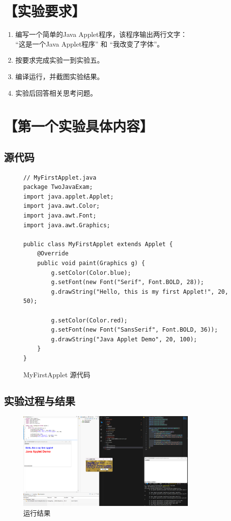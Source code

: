 \documentclass[12pt,a4paper]{article}
\begin{document}
\section*{【实验要求】}
\begin{enumerate}
    \item 编写一个简单的Java Applet程序，该程序输出两行文字：\\
    “这是一个Java Applet程序” 和 “我改变了字体”。
    \item 按要求完成实验一到实验五。
    \item 编译运行，并截图实验结果。
    \item 实验后回答相关思考问题。
\end{enumerate}

\section*{【第一个实验具体内容】}

\subsection*{源代码}
\begin{figure}[H]
\centering
\begin{lstlisting}
// MyFirstApplet.java
package TwoJavaExam;
import java.applet.Applet;
import java.awt.Color;
import java.awt.Font;
import java.awt.Graphics;

public class MyFirstApplet extends Applet {
    @Override
    public void paint(Graphics g) {
        g.setColor(Color.blue);
        g.setFont(new Font("Serif", Font.BOLD, 28));
        g.drawString("Hello, this is my first Applet!", 20, 50);

        g.setColor(Color.red);
        g.setFont(new Font("SansSerif", Font.BOLD, 36));
        g.drawString("Java Applet Demo", 20, 100);
    }
}

\end{lstlisting}
\caption{MyFirstApplet 源代码}
\end{figure}

\subsection*{实验过程与结果}

\begin{figure}[H]
\centering
\includegraphics[width=0.8\textwidth]{one.png}
\caption{运行结果}
\end{figure}
\end{document}
